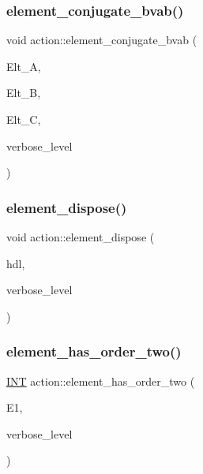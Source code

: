 \subsubsection{\texorpdfstring{element\+\_\+conjugate\+\_\+bvab()}{element\_conjugate\_bvab()}}
{\footnotesize\ttfamily void action\+::element\+\_\+conjugate\+\_\+bvab (\begin{DoxyParamCaption}\item[{\mbox{\hyperlink{galois_8h_a09fddde158a3a20bd2dcadb609de11dc}{I\+NT}} $\ast$}]{Elt\+\_\+A,  }\item[{\mbox{\hyperlink{galois_8h_a09fddde158a3a20bd2dcadb609de11dc}{I\+NT}} $\ast$}]{Elt\+\_\+B,  }\item[{\mbox{\hyperlink{galois_8h_a09fddde158a3a20bd2dcadb609de11dc}{I\+NT}} $\ast$}]{Elt\+\_\+C,  }\item[{\mbox{\hyperlink{galois_8h_a09fddde158a3a20bd2dcadb609de11dc}{I\+NT}}}]{verbose\+\_\+level }\end{DoxyParamCaption})}

\mbox{\label{classaction_a662a446b58c96741ba0eec42f4f95f79}} 
\subsubsection{\texorpdfstring{element\+\_\+dispose()}{element\_dispose()}}
{\footnotesize\ttfamily void action\+::element\+\_\+dispose (\begin{DoxyParamCaption}\item[{\mbox{\hyperlink{galois_8h_a09fddde158a3a20bd2dcadb609de11dc}{I\+NT}}}]{hdl,  }\item[{\mbox{\hyperlink{galois_8h_a09fddde158a3a20bd2dcadb609de11dc}{I\+NT}}}]{verbose\+\_\+level }\end{DoxyParamCaption})}

\mbox{\label{classaction_aa95202fa29f7ac079cbbf1fa18bc2f28}} 
\subsubsection{\texorpdfstring{element\+\_\+has\+\_\+order\+\_\+two()}{element\_has\_order\_two()}}
{\footnotesize\ttfamily \mbox{\hyperlink{galois_8h_a09fddde158a3a20bd2dcadb609de11dc}{I\+NT}} action\+::element\+\_\+has\+\_\+order\+\_\+two (\begin{DoxyParamCaption}\item[{\mbox{\hyperlink{galois_8h_a09fddde158a3a20bd2dcadb609de11dc}{I\+NT}} $\ast$}]{E1,  }\item[{\mbox{\hyperlink{galois_8h_a09fddde158a3a20bd2dcadb609de11dc}{I\+NT}}}]{verbose\+\_\+level }\end{DoxyParamCaption})}

